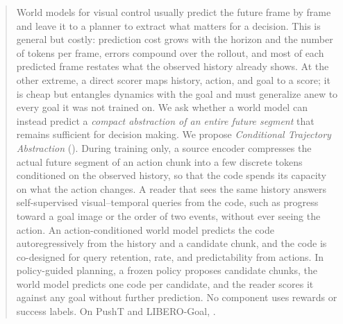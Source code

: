 \begin{abstract}
World models for visual control usually predict the future frame by frame and leave it to a planner to extract what matters for a decision.
This is general but costly: prediction cost grows with the horizon and the number of tokens per frame, errors compound over the rollout, and most of each predicted frame restates what the observed history already shows.
At the other extreme, a direct scorer maps history, action, and goal to a score; it is cheap but entangles dynamics with the goal and must generalize anew to every goal it was not trained on.
We ask whether a world model can instead predict a \emph{compact abstraction of an entire future segment} that remains sufficient for decision making.
We propose \emph{Conditional Trajectory Abstraction} (\method).
During training only, a source encoder compresses the actual future segment of an action chunk into a few discrete tokens conditioned on the observed history, so that the code spends its capacity on what the action changes.
A reader that sees the same history answers self-supervised visual--temporal queries from the code, such as progress toward a goal image or the order of two events, without ever seeing the action.
An action-conditioned world model predicts the code autoregressively from the history and a candidate chunk, and the code is co-designed for query retention, rate, and predictability from actions.
In policy-guided planning, a frozen policy proposes candidate chunks, the world model predicts one code per candidate, and the reader scores it against any goal without further prediction.
No component uses rewards or success labels.
On PushT and LIBERO-Goal, \method{} .
\end{abstract}
